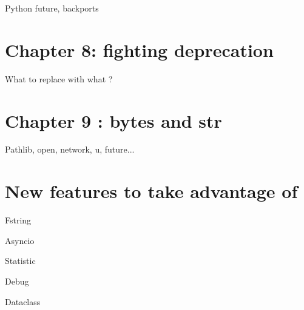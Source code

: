 \documentclass[paperwidth=8in, paperheight=10in,lang=en]{elegantbook}
\begin{document}
Python future, backports

\chapter{Chapter 8: fighting deprecation}

What to replace with what ?

\chapter{Chapter 9 : bytes and str}

Pathlib, open, network, u, future...

\chapter{New features to take advantage of}\label{chap:new_features}


Fstring

Asyncio

Statistic

Debug

Dataclass

\appendix

\printglossaries

\backmatter %


\end{document}
